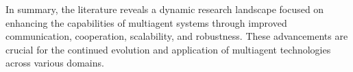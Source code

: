 In summary, the literature reveals a dynamic research landscape focused on enhancing the capabilities of multiagent systems through improved communication, cooperation, scalability, and robustness. These advancements are crucial for the continued evolution and application of multiagent technologies across various domains.